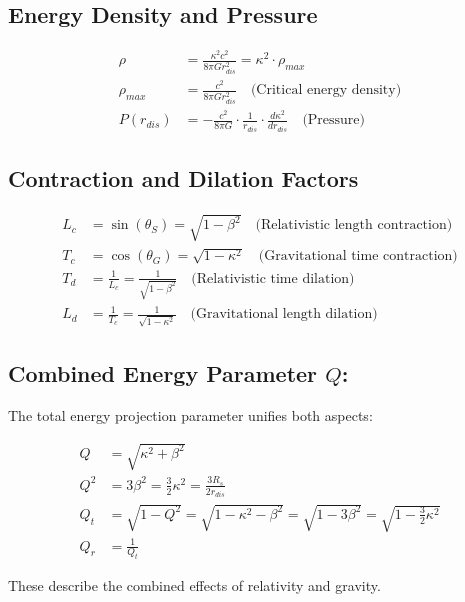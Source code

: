 \documentclass{article}
\begin{document}
\begin{theorem}
\subsection{Energy Density and Pressure}

\begin{align}
    \rho &= \frac{\kappa^2 c^2}{8\pi G r_{dis}^2} = \kappa^2 \cdot \rho_{max} \\
    \rho_{max} &= \frac{c^2}{8\pi G r_{dis}^2} \quad \text{(Critical energy density)} \\
    P(r_{dis}) &= - \frac{c^2}{8\pi G} \cdot \frac{1}{r_{dis}} \cdot \frac{d\kappa^2}{dr_{dis}} \quad \text{(Pressure)}
\end{align}

\subsection{Contraction and Dilation Factors}

\begin{align}
    L_c &= \sin\left(\theta_S\right) = \sqrt{1 - \beta^2} \quad \text{(Relativistic length contraction)} \\
    T_c &= \cos\left(\theta_G\right) = \sqrt{1 - \kappa^2} \quad \text{(Gravitational time contraction)} \\
    T_d &= \frac{1}{L_c} = \frac{1}{\sqrt{1-\beta^2}} \quad \text{(Relativistic time dilation)} \\
    L_d &= \frac{1}{T_c} = \frac{1}{\sqrt{1-\kappa^2}} \quad \text{(Gravitational length dilation)}
\end{align}

\subsection{Combined Energy Parameter $Q$:}
The total energy projection parameter unifies both aspects:

\begin{align}
    Q &=\sqrt{\kappa^2 + \beta^2}  \\
    Q^{2}&= 3\beta^2 = \frac{3}{2}\kappa^2 = \frac{3R_s}{2r_{dis}} \\
    Q_t &= \sqrt{1-Q^2} = \sqrt{1-\kappa^2-\beta^2} = \sqrt{1-3\beta^2} = \sqrt{1-\frac{3}{2}\kappa^2} \\
    Q_r &= \frac{1}{Q_t}
\end{align}

These describe the combined effects of relativity and gravity.


\end{theorem}
\end{document}
